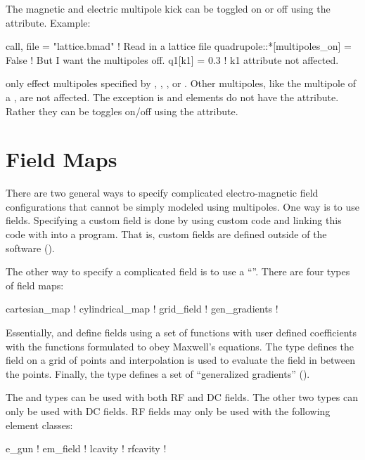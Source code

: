 The magnetic and electric multipole kick can be toggled on or off using the
 attribute. Example:
\begin{example}
  call, file = "lattice.bmad"             ! Read in a lattice file
  quadrupole::*[multipoles_on] = False    ! But I want the multipoles off.
  q1[k1] = 0.3                            ! k1 attribute not affected.
\end{example}
 only effect multipoles specified by , , , or
. Other multipoles, like the  multipole of a , are not
affected. The exception is  and  elements do not have the
 attribute. Rather they can be toggles on/off using the 
attribute.

\section{Field Maps}
\label{s:fieldmap}

There are two general ways to specify complicated electro-magnetic field configurations
that cannot be simply modeled using multipoles. One way is to use 
fields. Specifying a custom field is done by using custom code and linking this code with
\bmad into a program. That is, custom fields are defined outside of the \bmad software
().

The other way to specify a complicated field is to use a ``''. There
are four types of field maps:
\begin{example}
  cartesian_map       ! 
  cylindrical_map     ! 
  grid_field          ! 
  gen_gradients        ! 
\end{example}
Essentially,  and  define fields using a set of
functions with user defined coefficients with the functions formulated to obey Maxwell's
equations. The  type defines the field on a grid of points and
interpolation is used to evaluate the field in between the points. Finally, the
 type defines a set of ``generalized gradients'' ().

The  and  types can be used with both RF and DC fields.
The other two types can only be used with DC fields. RF fields may only be used with the following
element classes:
\begin{example}
  e_gun         ! 
  em_field      ! 
  lcavity       ! 
  rfcavity      ! 
\end{example}

